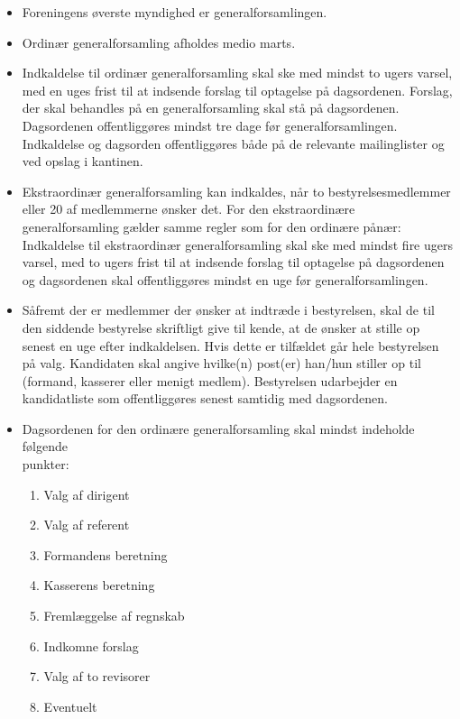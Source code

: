\documentclass[a4paper, 10pt]{article}
\begin{document}
\begin{itemize}

\item Foreningens øverste myndighed er generalforsamlingen.

\item Ordinær generalforsamling afholdes medio marts.

\item Indkaldelse til ordinær generalforsamling skal ske med mindst to
ugers varsel, med en uges frist til at indsende forslag til optagelse
på dagsordenen. Forslag, der skal behandles på en generalforsamling
skal stå på dagsordenen. Dagsordenen offentliggøres mindst tre dage
før generalforsamlingen. Indkaldelse og dagsorden offentliggøres både
på de relevante mailinglister og ved opslag i kantinen.

\item Ekstraordinær generalforsamling kan indkaldes, når to
bestyrelsesmed\-lemmer eller 20 af medlemmerne ønsker det. For den
ekstraordinære generalforsamling gælder samme regler som for den
ordinære pånær: Indkaldelse til ekstraordinær generalforsamling skal
ske med mindst fire ugers varsel, med to ugers frist til at indsende
forslag til optagelse på dagsordenen og dagsordenen skal
offentliggøres mindst en uge før generalforsamlingen.

\item Såfremt der er medlemmer der ønsker at indtræde i bestyrelsen,
skal de til den siddende bestyrelse skriftligt give til kende, at de
ønsker at stille op senest en uge efter indkaldelsen.  Hvis dette er
tilfældet går hele bestyrelsen på valg. Kandidaten skal angive
hvilke(n) post(er) han/hun stiller op til (formand, kasserer eller
menigt medlem). Bestyrelsen udarbejder en kandidatliste som
offentliggøres senest samtidig med dagsordenen.

\item Dagsordenen for den ordinære generalforsamling skal mindst
indeholde følgende \\ punkter:

\begin{enumerate}

\item Valg af dirigent

\item Valg af referent

\item Formandens beretning

\item Kasserens beretning

\item Fremlæggelse af regnskab

\item Indkomne forslag

\item Valg af to revisorer

\item Eventuelt

\end{enumerate}

\end{itemize}
\end{document}
